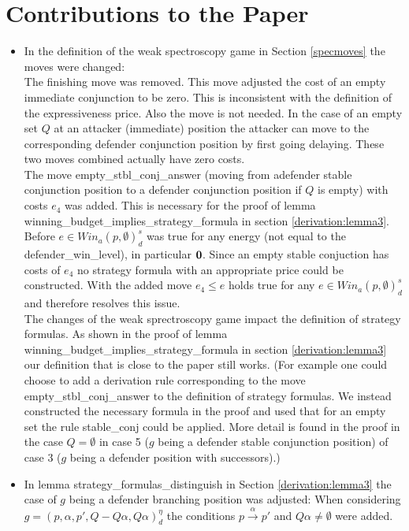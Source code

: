 \section{Contributions to the Paper}

\begin{itemize}
\item In the definition of the weak spectroscopy game in Section \ref{specmoves} the moves were changed: 
\\
The finishing move was removed. This move adjusted the cost of an empty immediate conjunction to be zero.
This is inconsistent with the definition of the expressiveness price. Also the move is not needed. In the 
case of an empty set $Q$ at an attacker (immediate) position the attacker can move to the corresponding 
defender conjunction position by first going delaying. These two moves combined actually have zero costs.
\\
The move empty\_stbl\_conj\_answer (moving from adefender stable conjunction position to a defender conjunction
position if $Q$ is empty) with costs $e_4$ was added. This is necessary for the proof of lemma 
winning\_budget\_implies\_strategy\_formula in section \ref{derivation:lemma3}. Before 
$e \in Win_a (p, \emptyset)_d^s $ was true for any energy (not equal to the defender\_win\_level), in particular $\bold{0}$. 
Since an empty stable conjuction has costs of $e_4$ no strategy formula with an appropriate price could be constructed. 
With the added move $e_4 \leq e $ holds true for any $e \in Win_a (p, \emptyset)_d^s $ and therefore resolves this issue.
\\
The changes of the weak sprectroscopy game impact the definition of strategy formulas. As shown in the proof 
of lemma winning\_budget\_implies\_strategy\_formula in section \ref{derivation:lemma3} our definition that is close 
to the paper still works. (For example one could choose to add a derivation rule corresponding to the move empty\_stbl\_conj\_answer to the definition 
of strategy formulas. We instead constructed the necessary formula in the proof and used that for an empty set the rule stable\_conj could be applied.
More detail is found in the proof in the case $Q=\emptyset$ in case 5 ($g$ being a defender stable conjunction position) 
of case 3 ($g$ being a defender position with successors).)
\item In lemma strategy\_formulas\_distinguish in Section \ref{derivation:lemma3} the case of $g$ being a defender branching position was adjusted: 
When considering $g=(p,\alpha ,p', Q- Q \alpha, Q \alpha)_d^\eta$ the conditions $p \overset{\alpha}{\longrightarrow} p'$ and $Q \alpha \neq \emptyset$ were 
added. 
\end{itemize}